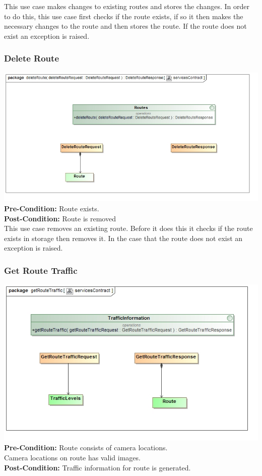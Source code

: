 \documentclass[a4paper,12pt]{article}
\begin{document}
This use case makes changes to existing routes and stores the changes. In order to do this, this use case first checks if the route exists, if so it then makes the necessary changes to the route and then stores the route. If the route does not exist an exception is raised. 
\subsubsection{Delete Route}
\includegraphics[width=\textwidth]{images/scDelete_Route.jpg}
\textbf{Pre-Condition: }
Route exists.\\
\textbf{Post-Condition: }
Route is removed\\
This use case removes an existing route. Before it does this it checks if the route exists in storage then removes it. In the case that the route does not exist an exception is raised.
\subsubsection{Get Route Traffic}
\includegraphics[width=\textwidth]{images/scDetermine_Traffic.jpg}
\textbf{Pre-Condition: }
Route consists of camera locations.\\
Camera locations on route has valid images.\\
\textbf{Post-Condition: }
Traffic information for route is generated.\\
\end{document}
